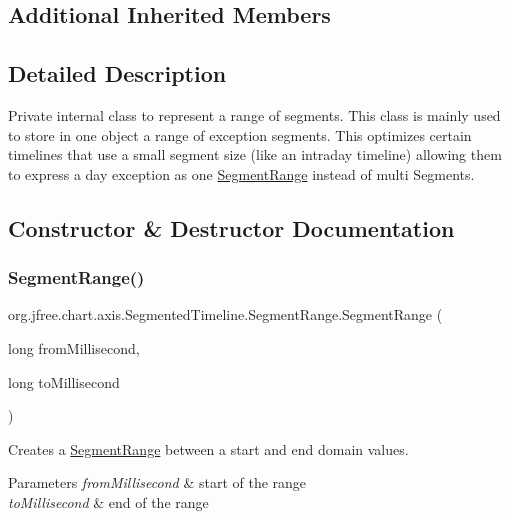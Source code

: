 \subsection*{Additional Inherited Members}


\subsection{Detailed Description}
Private internal class to represent a range of segments. This class is mainly used to store in one object a range of exception segments. This optimizes certain timelines that use a small segment size (like an intraday timeline) allowing them to express a day exception as one \mbox{\hyperlink{classorg_1_1jfree_1_1chart_1_1axis_1_1_segmented_timeline_1_1_segment_range}{Segment\+Range}} instead of multi Segments. 

\subsection{Constructor \& Destructor Documentation}
\mbox{\label{classorg_1_1jfree_1_1chart_1_1axis_1_1_segmented_timeline_1_1_segment_range_a36f8f53d5091e3429b4e81576fbd96e1}} 
\subsubsection{\texorpdfstring{Segment\+Range()}{SegmentRange()}}
{\footnotesize\ttfamily org.\+jfree.\+chart.\+axis.\+Segmented\+Timeline.\+Segment\+Range.\+Segment\+Range (\begin{DoxyParamCaption}\item[{long}]{from\+Millisecond,  }\item[{long}]{to\+Millisecond }\end{DoxyParamCaption})}

Creates a \mbox{\hyperlink{classorg_1_1jfree_1_1chart_1_1axis_1_1_segmented_timeline_1_1_segment_range}{Segment\+Range}} between a start and end domain values.


\begin{DoxyParams}{Parameters}
{\em from\+Millisecond} & start of the range \\
\hline
{\em to\+Millisecond} & end of the range \\
\hline
\end{DoxyParams}


